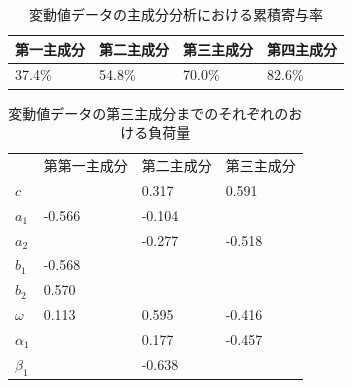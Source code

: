 \documentclass[a4j]{jarticle}
\begin{document}
\begin{table}[tb]
\centering
\caption{変動値データの主成分分析における累積寄与率}
\label{diff-comp-summary}
\begin{tabular}{|l|l|l|l|}
\hline
第一主成分&第二主成分&第三主成分&第四主成分\\
\hline
37.4\%&54.8\%&70.0\%&82.6\%\\
\hline
\end{tabular}
\end{table}

\begin{table}[tb]
\centering
\caption{変動値データの第三主成分までのそれぞれのおける負荷量}
\label{diff-comp-loading}
\begin{tabular}{|l|l|l|l|}
\hline
&第第一主成分&第二主成分&第三主成分\\
$c$& &0.317&0.591\\
$a_1$&-0.566&-0.104& \\
$a_2$& &-0.277&-0.518\\
$b_1$&-0.568& & \\
$b_2$&0.570& & \\
$\omega$&0.113&0.595&-0.416\\
$\alpha_1$& &0.177&-0.457\\
$\beta_1$& &-0.638& \\
\hline
\end{tabular}
\end{table}
\end{document}

